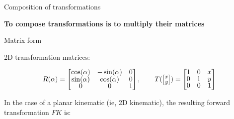 \documentclass[compress]{beamer}
\newcommand{\colvec}[2][.8]{%
  \scalebox{#1}{%
    \renewcommand{\arraystretch}{.8}%
    $\begin{bmatrix}#2\end{bmatrix}$%
  }
}
\begin{document}
\begin{frame}{Composition of transformations}
\begin{tikzpicture}
    \end{tikzpicture}

    \pause
    \textbf{To compose transformations is to multiply their matrices}

\end{frame}
\begin{frame}{Matrix form}

    \footnotesize
    2D transformation matrices:

    \begin{align*}
        R(\alpha) = \begin{bmatrix}\cos(\alpha) & -\sin(\alpha) & 0 \\
                                   \sin(\alpha) & \cos(\alpha) & 0 \\
                                   0 &0 &1 \end{bmatrix}, \qquad
        T(\colvec{x \\y}) =  \begin{bmatrix} 1 & 0 & x \\
                                             0 & 1 & y \\
                                             0 & 0 & 1 \end{bmatrix}
    \end{align*}

    \pause

    In the case of a planar kinematic (ie, 2D kinematic), the resulting forward transformation $FK$ is:


\end{frame}
\end{document}
